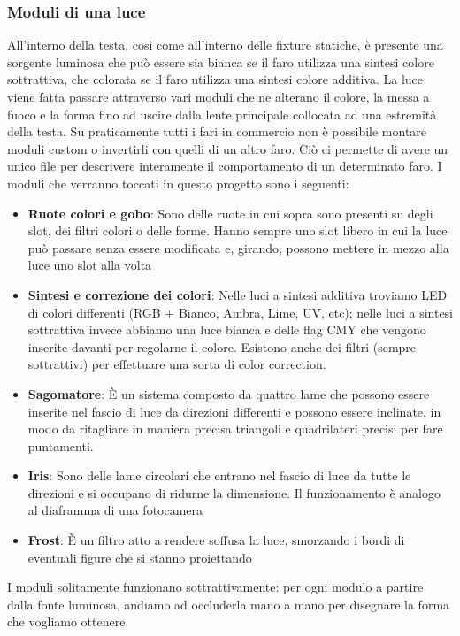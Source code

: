 \documentclass[main.tex]{subfiles}
\begin{document}
\subsubsection{Moduli di una luce}
All'interno della testa, così come all'interno delle fixture statiche, è presente una sorgente luminosa che può essere sia bianca se il faro utilizza una sintesi colore sottrattiva, che colorata se il faro utilizza una sintesi colore additiva. La luce viene fatta passare attraverso vari moduli che ne alterano il colore, la messa a fuoco e la forma fino ad uscire dalla lente principale collocata ad una estremità della testa. Su praticamente tutti i fari in commercio non è possibile montare moduli custom o invertirli con quelli di un altro faro. Ciò ci permette di avere un unico file per descrivere interamente il comportamento di un determinato faro. \newline
I moduli che verranno toccati in questo progetto sono i seguenti:
\begin{itemize}
    \item \textbf{Ruote colori e gobo}: Sono delle ruote in cui sopra sono presenti su degli slot, dei filtri colori o delle forme. Hanno sempre uno slot libero in cui la luce può passare senza essere modificata e, girando, possono mettere in mezzo alla luce uno slot alla volta
    \item \textbf{Sintesi e correzione dei colori}: Nelle luci a sintesi additiva troviamo LED di colori differenti (RGB + Bianco, Ambra, Lime, UV, etc); nelle luci a sintesi sottrattiva invece abbiamo una luce bianca e delle flag CMY che vengono inserite davanti per regolarne il colore. Esistono anche dei filtri (sempre sottrattivi) per effettuare una sorta di color correction.
    \item \textbf{Sagomatore}: È un sistema composto da quattro lame che possono essere inserite nel fascio di luce da direzioni differenti e possono essere inclinate, in modo da ritagliare in maniera precisa triangoli e quadrilateri precisi per fare puntamenti.
    \item \textbf{Iris}: Sono delle lame circolari che entrano nel fascio di luce da tutte le direzioni e si occupano di ridurne la dimensione. Il funzionamento è analogo al diaframma di una fotocamera
    \item \textbf{Frost}: È un filtro atto a rendere soffusa la luce, smorzando i bordi di eventuali figure che si stanno proiettando
\end{itemize}
I moduli solitamente funzionano sottrattivamente: per ogni modulo a partire dalla fonte luminosa, andiamo ad occluderla mano a mano per disegnare la forma che vogliamo ottenere.
\end{document}
